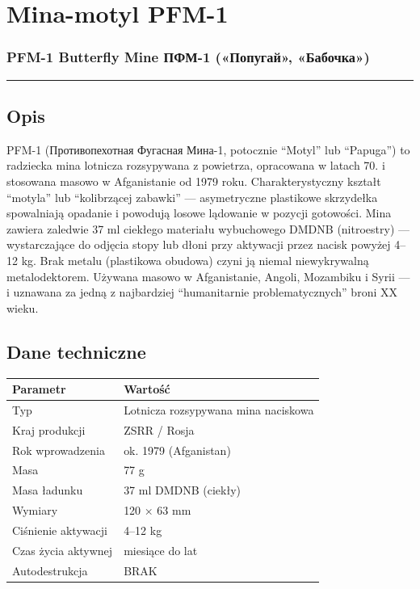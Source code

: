 \documentclass[12pt,openany,oneside]{book}
\begin{document}
\chapter{Mina-motyl PFM-1}\label{mina-motyl-pfm-1}

\subsection{PFM-1 Butterfly Mine \textbar{} ПФМ-1 («Попугай»,
«Бабочка»)}\label{pfm-1-butterfly-mine-ux43fux444ux43c-1-ux43fux43eux43fux443ux433ux430ux439-ux431ux430ux431ux43eux447ux43aux430}

\begin{center}\rule{0.5\linewidth}{0.5pt}\end{center}

\section{Opis}\label{opis-111}

PFM-1 (Противопехотная Фугасная Мина-1, potocznie ``Motyl'' lub
``Papuga'') to radziecka mina lotnicza rozsypywana z powietrza,
opracowana w latach 70. i stosowana masowo w Afganistanie od 1979 roku.
Charakterystyczny kształt ``motyla'' lub ``kolibrzącej zabawki'' ---
asymetryczne plastikowe skrzydełka spowalniają opadanie i powodują
losowe lądowanie w pozycji gotowości. Mina zawiera zaledwie 37 ml
ciekłego materiału wybuchowego DMDNB (nitroestry) --- wystarczające do
odjęcia stopy lub dłoni przy aktywacji przez nacisk powyżej 4--12 kg.
Brak metalu (plastikowa obudowa) czyni ją niemal niewykrywalną
metalodektorem. Używana masowo w Afganistanie, Angoli, Mozambiku i Syrii
--- i uznawana za jedną z najbardziej ``humanitarnie problematycznych''
broni XX wieku.

\section{Dane techniczne}\label{dane-techniczne-111}

\begin{longtable}[]{@{}ll@{}}
\toprule\noalign{}
Parametr & Wartość \\
\midrule\noalign{}
\endhead
\bottomrule\noalign{}
\endlastfoot
Typ & Lotnicza rozsypywana mina naciskowa \\
Kraj produkcji & ZSRR / Rosja \\
Rok wprowadzenia & ok. 1979 (Afganistan) \\
Masa & 77 g \\
Masa ładunku & 37 ml DMDNB (ciekły) \\
Wymiary & 120 × 63 mm \\
Ciśnienie aktywacji & 4--12 kg \\
Czas życia aktywnej & miesiące do lat \\
Autodestrukcja & BRAK \\
\end{longtable}
\end{document}
